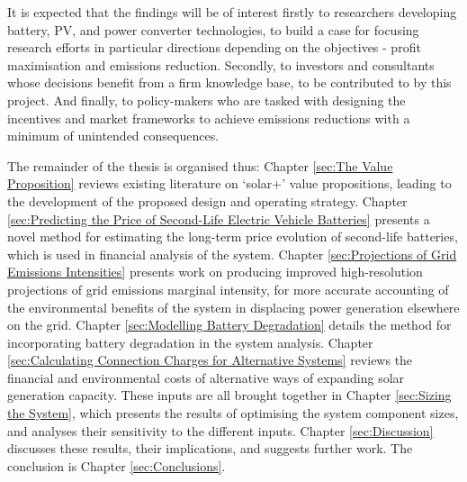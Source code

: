 \documentclass[report_18month.tex]{subfiles}
\begin{document}
It is expected that the findings will be of interest firstly to researchers developing battery, PV, and power converter technologies, to build a case for focusing research efforts in particular directions depending on the objectives - profit maximisation and emissions reduction. Secondly, to investors and consultants whose decisions benefit from a firm knowledge base, to be contributed to by this project. And finally, to policy-makers who are tasked with designing the incentives and market frameworks to achieve emissions reductions with a minimum of unintended consequences.

The remainder of the thesis is organised thus: Chapter \ref{sec:The Value Proposition} reviews existing literature on `solar+' value propositions, leading to the development of the proposed design and operating strategy. Chapter \ref{sec:Predicting the Price of Second-Life Electric Vehicle Batteries} presents a novel method for estimating the long-term price evolution of second-life batteries, which is used in financial analysis of the system. Chapter \ref{sec:Projections of Grid Emissions Intensities} presents work on producing improved high-resolution projections of grid emissions marginal intensity, for more accurate accounting of the environmental benefits of the system in displacing power generation elsewhere on the grid. Chapter \ref{sec:Modelling Battery Degradation} details the method for incorporating battery degradation in the system analysis. Chapter \ref{sec:Calculating Connection Charges for Alternative Systems} reviews the financial and environmental costs of alternative ways of expanding solar generation capacity. These inputs are all brought together in Chapter \ref{sec:Sizing the System}, which presents the results of optimising the system component sizes, and analyses their sensitivity to the different inputs. Chapter \ref{sec:Discussion} discusses these results, their implications, and suggests further work. The conclusion is Chapter \ref{sec:Conclusions}.
\end{document}
